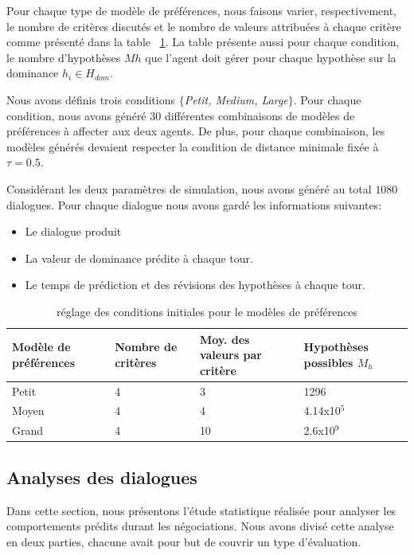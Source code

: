 Pour chaque type de modèle de préférences, nous faisons varier, respectivement, le nombre de critères discutés et le nombre de valeurs attribuées à chaque critère comme présenté dans la table ~\ref {tab:initP}. La table présente aussi pour chaque condition, le nombre d'hypothèses $Mh$ que l'agent doit gérer pour chaque hypothèse sur la dominance $h_i \in H_{dom}$.

Nous avons définis trois conditions \emph {$\{$Petit, Medium, Large$\}$}.
Pour chaque condition, nous avons généré $ 30 $ différentes combinaisons de modèles de préférences à affecter aux deux agents. De plus, pour chaque combinaison, les modèles générés devaient respecter la condition de distance minimale fixée à $\tau =0.5$. 

Considérant les deux paramètres de simulation, nous avons généré au total $1080$ dialogues. Pour chaque dialogue nous avons gardé les informations suivantes:
\begin{itemize}
	\item Le dialogue produit
	\item La valeur de dominance prédite à chaque tour.
	\item Le temps de prédiction et des révisions des hypothèses à chaque tour.
	
\end{itemize} 



\begin{table}[]
	\caption{réglage des conditions initiales pour le modèles de préférences} 
	\centering
	\begin{tabular}{|p{2cm}|p{2cm}|p{2.65cm}|p{2.35cm}|}
		\hline 
		Modèle de préférences  & Nombre de critères & Moy. des valeurs par critère & Hypothèses possibles $M_h$\\
		\hline
		Petit & 4 & 3 & 1296 \\
		\hline
		Moyen & 4 & 4 & 4.14x10$^5$ \\
		\hline
		Grand & 4 & 10 & 2.6x10$^9$ \\
		\hline
	\end{tabular}
	
	\label{tab:initP}
\end{table}

\subsection{Analyses des dialogues}
Dans cette section, nous présentons l'étude statistique réalisée pour analyser les comportements prédits durant les négociations.
Nous avons divisé cette analyse en deux parties, chacune avait pour but de couvrir un type d'évaluation.
 

